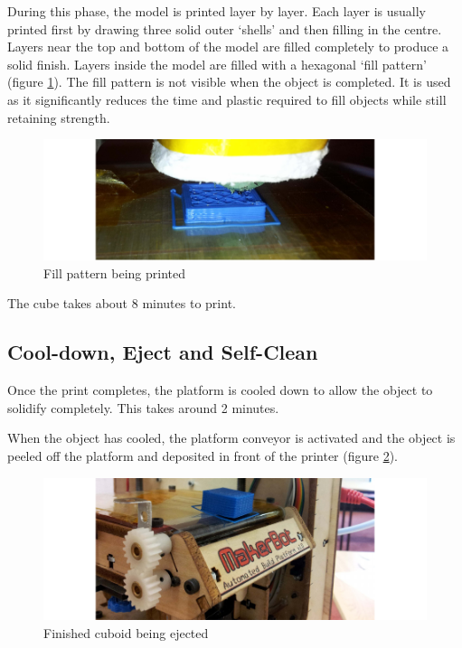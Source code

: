 			During this phase, the model is printed layer by layer. Each layer is
			usually printed first by drawing three solid outer `shells' and then
			filling in the centre. Layers near the top and bottom of the model are
			filled completely to produce a solid finish. Layers inside the model are
			filled with a hexagonal `fill pattern' (figure \ref{fig:fillPattern}). The
			fill pattern is not visible when the object is completed. It is used as it
			significantly reduces the time and plastic required to fill objects while
			still retaining strength.
			
			\begin{figure}
				\includegraphics[width=1\textwidth]{diagrams/fillPattern.pdf}
				\caption{Fill pattern being printed}
				\label{fig:fillPattern}
			\end{figure}
			
			The cube takes about 8 minutes to print.
		
		\subsection{Cool-down, Eject and Self-Clean}
			
			Once the print completes, the platform is cooled down to allow
			the object to solidify completely. This takes around 2 minutes.
			
			When the object has cooled, the platform conveyor is activated and the
			object is peeled off the platform and deposited in front of the printer
			(figure \ref{fig:eject}).
			
			\begin{figure}
				\includegraphics[width=1\textwidth]{diagrams/eject.pdf}
				\caption{Finished cuboid being ejected}
				\label{fig:eject}
			\end{figure}
			
